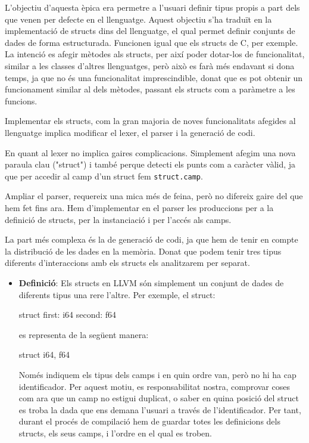 ﻿\documentclass{article}
\begin{document}
L'objectiu d'aquesta èpica era permetre a l'usuari definir tipus propis a part
dels que venen per defecte en el llenguatge. Aquest objectiu s'ha traduït en la
implementació de structs dins del llenguatge, el qual permet definir conjunts de
dades de forma estructurada. Funcionen igual que els structs de C, per exemple.
La intenció es afegir mètodes als structs, per així poder dotar-los de
funcionalitat, similar a les classes d'altres llenguatges, però això es farà més
endavant si dona temps, ja que no és una funcionalitat imprescindible, donat que
es pot obtenir un funcionament similar al dels mètodes, passant els structs com
a paràmetre a les funcions.

Implementar els structs, com la gran majoria de noves funcionalitats afegides al
llenguatge implica modificar el lexer, el parser i la generació de codi. 

En quant al lexer no implica gaires complicacions. Simplement afegim una nova
paraula clau ("struct") i també perque detecti els punts com a caràcter vàlid,
ja que per accedir al camp d'un struct fem \texttt{struct.camp}.

Ampliar el parser, requereix una mica més de feina, però no difereix gaire del
que hem fet fins ara. Hem d'implementar en el parser les produccions per a la
definició de structs, per la instanciació i per l'accés als camps.

La part més complexa és la de generació de codi, ja que hem de tenir en compte
la distribució de les dades en la memòria. Donat que podem tenir tres tipus
diferents d'interaccions amb els structs els analitzarem per separat.

\begin{itemize}
\item \textbf{Definició}: Els structs en LLVM són simplement un conjunt
    de dades de diferents tipus una rere l'altre. Per exemple, el struct:

    \begin{code}
        struct {
            first: i64
            second: f64
        }
    \end{code}

    es representa de la següent manera:

    \begin{code}
        struct { i64, f64 }
    \end{code}

    Només indiquem els tipus dels camps i en quin ordre van, però no hi ha cap
    identificador. Per aquest motiu, es responsabilitat nostra, comprovar coses
    com ara que un camp no estigui duplicat, o saber en quina posició del struct
    es troba la dada que ens demana l'usuari a través de l'identificador. Per
    tant, durant el procés de compilació hem de guardar totes les definicions
    dels structs, els seus camps, i l'ordre en el qual es troben.
\end{itemize}
\end{document}
